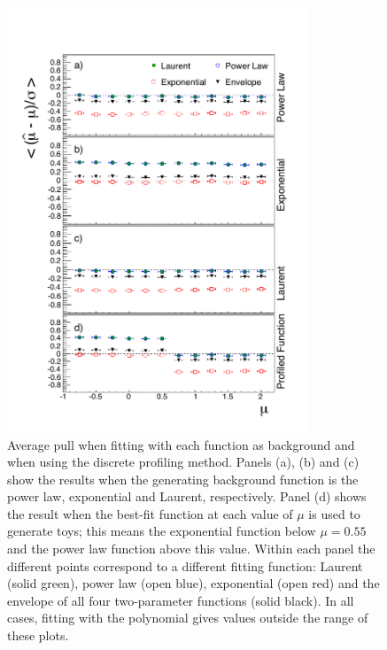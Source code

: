 \begin{figure}[tbp]
\centering
\includegraphics[width=0.8\textwidth]{functions/FirstOrderFunctions.pdf}
\caption{Average pull when fitting with each function as background and when
using the discrete profiling method. Panels (a), (b) and (c) show the results
when the generating background function is the power law, exponential and Laurent,
respectively. Panel (d) shows the result when the best-fit function at each
value of $\mu$ is used to generate toys; this means the exponential function
below $\mu = 0.55$ and the power law function above this value. Within each panel the different
points correspond to a different fitting function: Laurent (solid green), power law (open blue), exponential (open red) and the envelope of all four two-parameter functions (solid black). In all cases,
fitting with the polynomial gives values outside the range of these plots.}
\label{fig:functions:firstorderbias}
\end{figure}

